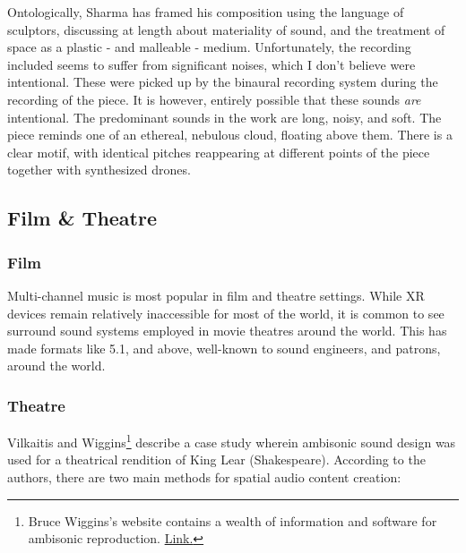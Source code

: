 Ontologically, Sharma has framed his composition using the language of sculptors, discussing at length about materiality of sound, and the treatment of space as a plastic - and malleable - medium. Unfortunately, the recording included seems to suffer from significant noises, which I don't believe were intentional. These were picked up by the binaural recording system during the recording of the piece. It is however, entirely possible that these sounds \textit{are} intentional. The predominant sounds in the work are long, noisy, and soft. The piece reminds one of an ethereal, nebulous cloud, floating above them. There is a clear motif, with identical pitches reappearing at different points of the piece together with synthesized drones. 
 

\subsection{Film \& Theatre}

\subsubsection{Film}
Multi-channel music is most popular in film and theatre settings. While XR devices remain relatively inaccessible for most of the world, it is common to see surround sound systems employed in movie theatres around the world. This has made formats like 5.1, and above, well-known to sound engineers, and patrons, around the world. 


\subsubsection{Theatre}

Vilkaitis and Wiggins\footnote{Bruce Wiggins's website contains a wealth of information and software for ambisonic reproduction. \href{https://www.brucewiggins.co.uk/?page_id=78}{Link.}} \cite{vilkaitis2019ambisonic} describe a case study wherein ambisonic sound design was used for a theatrical rendition of King Lear (Shakespeare). According to the authors, there are two main methods for spatial audio content creation:

